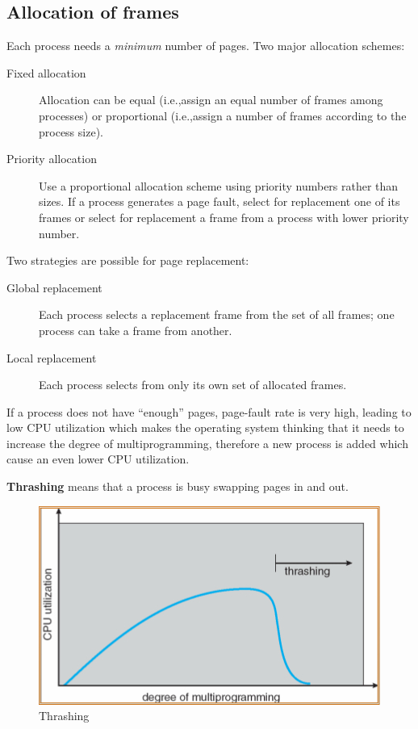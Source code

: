 \subsection{Allocation of frames}
Each process needs a \emph{minimum} number of pages. Two major allocation schemes:
\begin{description}
\item [Fixed allocation] Allocation can be equal (i.e.,\@ assign an equal number of frames among processes) or proportional (i.e.,\@ assign a number of frames according to the process size).
\item [Priority allocation] Use a proportional allocation scheme using priority numbers rather than sizes. If a process generates a page fault, select for replacement one of its frames or select for replacement a frame from a process with lower priority number.
\end{description}
Two strategies are possible for page replacement:
\begin{description}
\item [Global replacement] Each process selects a replacement frame from the set of all frames; one process can take a frame from another.
\item [Local replacement] Each process selects from only its own set of allocated frames.
\end{description}
If a process does not have ``enough'' pages, page-fault rate is very high, leading to low CPU utilization which makes the operating system thinking that it needs to increase the degree of multiprogramming, therefore a new process is added which cause an even lower CPU utilization.

\textbf{Thrashing} means that a process is busy swapping pages in and out.

\begin{figure}[hbtp]
\centering
\includegraphics[scale=0.4]{images/virtual_memory/thrashing.jpg}
\caption{Thrashing}
\end{figure}

